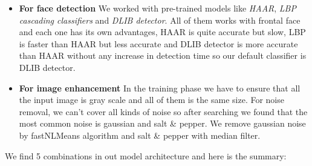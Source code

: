 \begin{itemize}
	\item \textbf{For face detection} \newline We worked with pre-trained models like \textit{HAAR}, \textit{LBP cascading classifiers} and \textit{DLIB detector}. \newline All of them works with frontal face and each one has its own advantages, HAAR is quite accurate but slow, LBP is faster than HAAR but less accurate and DLIB detector is more accurate than HAAR without any increase in detection time so our default classifier is DLIB detector. 
	\item \textbf{For image enhancement} \newline In the training phase we have to ensure that all the input image is gray scale and all of them is the same size. \newline For noise removal, we can’t cover all kinds of noise so after searching we found that the most common noise is gaussian and salt \& pepper. \newline  We remove gaussian noise by fastNLMeans algorithm and salt \& pepper with median filter. \newline
\end{itemize}

We find 5 combinations in out model architecture and here is the summary: 

